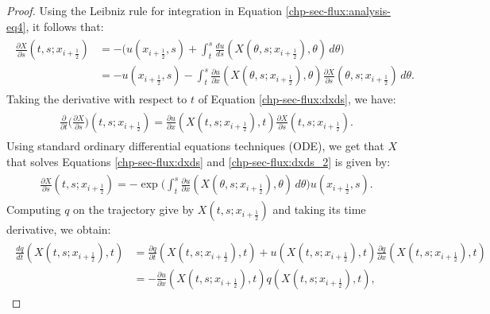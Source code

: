 \begin{proof}
	Using the Leibniz rule for integration in Equation \eqref{chp-sec-flux:analysis-eq4}, it follows that:
	\begin{align}
		\begin{split}
			\label{chp-sec-flux:dxds}
			\frac{\partial X}{\partial s} (t,s;x_{i+\frac{1}{2}}) &= - \bigg(u(x_{i+\frac{1}{2}},s) + 
			\int_{t}^{s} \frac{du}{ds}(X(\theta,s;x_{i+\frac{1}{2}}),\theta) \,d\theta \bigg)\\
			&=- u(x_{i+\frac{1}{2}},s) -
			\int_{t}^{s} \frac{\partial u}{\partial x}(X(\theta, s; x_{i+\frac{1}{2}}),\theta) 
			\frac{\partial X}{\partial s} (\theta, s; x_{i+\frac{1}{2}})\,d\theta.
		\end{split}
	\end{align}
	Taking the derivative with respect to $t$ of Equation \eqref{chp-sec-flux:dxds}, we have:
	\begin{align}
		\begin{split}
			\label{chp-sec-flux:dxds_2}
			\frac{\partial }{\partial t} \bigg(\frac{\partial X}{\partial s} \bigg)
			(t,s;x_{i+\frac{1}{2}}) = \frac{\partial u}{\partial x}(X(t, s; x_{i+\frac{1}{2}}), t) 
			\frac{\partial X}{\partial s} (t, s; x_{i+\frac{1}{2}}).
		\end{split}
	\end{align}
	Using standard ordinary differential equations techniques (ODE), 
    we get that $X$ that solves Equations \eqref{chp-sec-flux:dxds} and \eqref{chp-sec-flux:dxds_2}
	is given by:
	\begin{align}
		\begin{split}
			\label{chp-sec-flux:xs_int}
			\frac{\partial X}{\partial s}(t,s;x_{i+\frac{1}{2}}) = -
			\exp{\bigg(\int_{t}^{s} \frac{\partial u}{\partial x}(X(\theta,s;x_{i+\frac{1}{2}}),\theta)  \,d\theta \bigg)}
			u(x_{i+\frac{1}{2}},s).
		\end{split}
	\end{align}
	Computing $q$ on the trajectory give by $X(t,s;x_{i+\frac{1}{2}})$ and taking
	its time derivative, we obtain:
	\begin{align}
		\label{chp-sec-flux:dqdt}
		\begin{split}
			\frac{dq}{dt} (X(t,s;x_{i+\frac{1}{2}}),t) &= 
			\frac{\partial q}{\partial t} (X(t,s;x_{i+\frac{1}{2}}),t)+
			u (X(t,s;x_{i+\frac{1}{2}}),t)\frac{\partial q}{\partial x} (X(t,s;x_{i+\frac{1}{2}}),t) \\
			&= -\frac{\partial u}{\partial x}(X(t,s;x_{i+\frac{1}{2}}),t)  q (X(t,s;x_{i+\frac{1}{2}}),t),

\end{split}
\end{align}
\end{proof}
